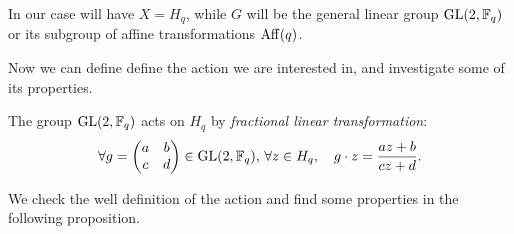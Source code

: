 In our case will have $X=H_q$, while $G$ will be the general linear group $\operatorname{GL}(2,{\mathbb F}_q)$ or its subgroup of
affine transformations $\operatorname{Aff} (q)$.

Now we can define define the action we are interested in, and investigate some of its properties.
\begin{defn}\label{flt}
The group $\operatorname{GL}(2,{\mathbb F}_q)$ acts on $H_q$ by {\it fractional linear transformation}:
\begin{equation}
	\forall g= \begin{pmatrix} a & b \\ c & d \end{pmatrix}\in \operatorname{GL}(2,{\mathbb F}_q),\, \forall z \in H_q, \quad g \cdot z = \frac{az+b}{cz+d}.
\end{equation}
\end{defn}

We check the well definition of the action and find some properties in the following proposition.

